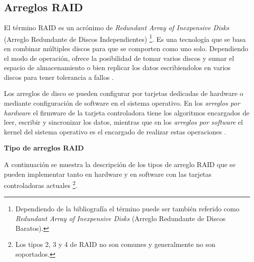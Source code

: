   \subsection {Arreglos RAID}

El t\'{e}rmino \textsc{RAID} es un acr\'{o}nimo de \emph{Redundant Array of Inexpensive Disks} (Arreglo Redundante de Discos Independientes) \cite{_bytepile.com_????} \footnote{Dependiendo de la bibliograf\'{i}a el t\'{e}rmino puede ser tambi\'{e}n referido como \emph{Redundant Array of Inexpensive Disks} (Arreglo Redundante de Discos Baratos).}. Es una tecnolog\'{i}a que se basa en combinar m\'{u}ltiples discos para que se comporten como uno solo. Dependiendo el modo de operaci\'{o}n, ofrece la posibilidad de tomar varios discos y sumar el espacio de almacenamiento o bien replicar los datos escribiendolos en varios discos para tener tolerancia a fallos \cite{_raid_????-2}.

Los arreglos de disco se pueden configurar por tarjetas dedicadas de hardware o mediante configuraci\'{o}n de software en el sistema operativo. En los \emph{arreglos por hardware} el firmware de la tarjeta controladora tiene los algoritmos encargados de leer, escribir y sincronizar los datos, mientras que en los \emph{arreglos por software} el kernel del sistema operativo es el encargado de realizar estas operaciones \cite{_chapter_????}.

\textbf{Tipo de arreglos RAID}

A continuaci\'{o}n se muestra la descripci\'{o}n de los tipos de arreglo \textsc{RAID} que se pueden implementar tanto en hardware y en software con las tarjetas controladoras actuales \footnote{Los tipos 2, 3 y 4 de \textsc{RAID} no son comunes y generalmente no son soportados.}.

